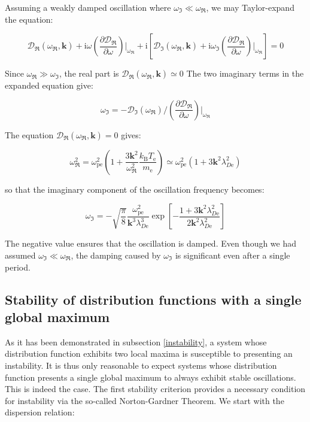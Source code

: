 Assuming a weakly damped oscillation where $\omega_\Im\ll\omega_\Re$, we may Taylor-expand the equation:

\begin{equation}
    \mathcal{D}_\Re(\omega_\Re,\mathbf{k})+\mathrm{i}\omega\left(\frac{\partial \mathcal{D}_\Re}{\partial\omega}\right)\Biggr|_{\omega_\Re}+\mathrm{i}\left[\mathcal{D}_\Im(\omega_\Re,\mathbf{k})+\mathrm{i}\omega_\Im\left(\frac{\partial \mathcal{D}_\Re}{\partial\omega}\right)\Biggr|_{\omega_\Re}\right]=0
\end{equation}

Since $\omega_\Re\gg\omega_\Im$, the real part is $\mathcal{D}_\Re(\omega_\Re,\mathbf{k})\simeq0$ The two imaginary terms in the expanded equation give:

\begin{equation}
    \omega_\Im=-\mathcal{D}_\Im(\omega_\Re)\biggr/\left(\frac{\partial \mathcal{D}_\Re}{\partial\omega}\right)\Biggr|_{\omega_\Re}
\end{equation}

The equation $\mathcal{D}_\Re(\omega_\Re,\mathbf{k})=0$ gives:

\begin{equation}
    \omega_\Re^2=\omega_\text{pe}^2\left(1+\frac{3\mathbf{k}^2}{\omega_\Re^2}\frac{k_\mathrm{B}T_\text{e}}{m_\text{e}}\right)\simeq\omega_\text{pe}^2\left(1+3\mathbf{k}^2\lambda_{D\text{e}}^2\right)
\end{equation}

so that the imaginary component of the oscillation frequency becomes:

\begin{equation}
    \omega_\Im=-\sqrt{\frac{\pi}{8}}\frac{\omega_\text{pe}^2}{\mathbf{k}^3\lambda_{D\text{e}}^3}\exp{\left[-\frac{1+3\mathbf{k}^2\lambda_{D\text{e}}^2}{2\mathbf{k}^2\lambda_{D\text{e}}^2}\right]}
\end{equation}

The negative value ensures that the oscillation is damped. Even though we had assumed $\omega_\Im\ll\omega_\Re$, the damping caused by $\omega_\Im$ is significant even after a single period.

\subsection{Stability of distribution functions with a single global maximum}

As it has been demonstrated in subsection \ref{instability}, a system whose distribution function exhibits two local maxima is susceptible to presenting an instability. It is thus only reasonable to expect systems whose distribution function presents a single global maximum to always exhibit stable oscillations. This is indeed the case. The first stability criterion provides a necessary condition for instability via the so-called Norton-Gardner Theorem. We start with the dispersion relation:

